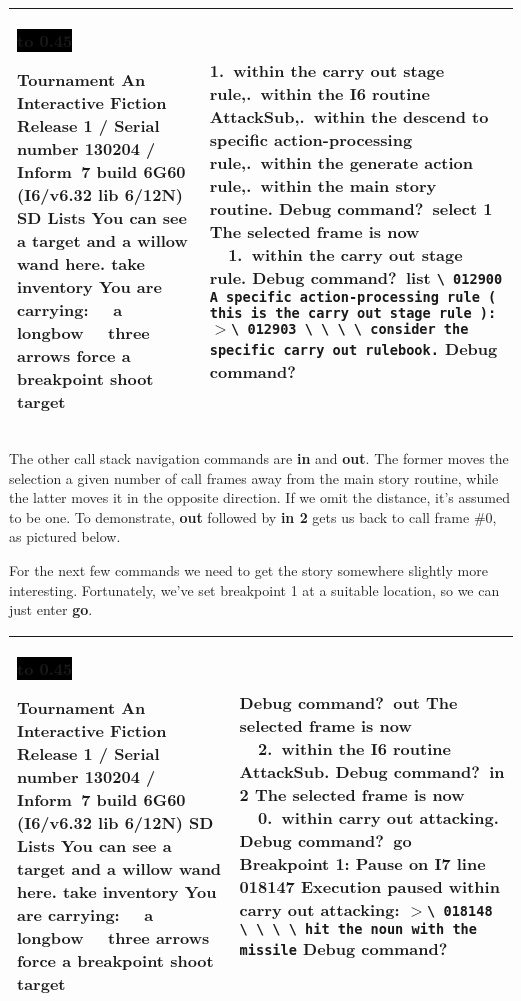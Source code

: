 \documentclass{book}
\newcommand{\n}{\hspace*{\fill}\newline}
\newcommand{\terp}[2]{\begin{center}\begin{tabular}{p{0.45\textwidth}|p{0.45\textwidth}}\midrule #1&#2\\\midrule\end{tabular}\end{center}}
\newcommand{\glkheading}[1]{\textbf{#1}}
\newcommand{\glkinput}[1]{\textbf{#1}}
\newcommand{\glkstatusline}[2]{\centerline{\colorbox{black}{\hbox to 0.45\textwidth{\textcolor{white}{#1\hfil #2}}}}}
\newcommand{\storyprompt}{\raisebox{1.5pt}{\(>\)}}
\newcommand{\cursor}{\raisebox{-1.5pt}{\RectangleThin}}
\newcommand{\markedindent}{\(>\)}
\newcommand{\unmarkedindent}{\hphantom{\(>\)}}
\begin{document}
\terp{\glkstatusline{Lists}{0/2}\n
  \glkheading{Tournament}\n
  An Interactive Fiction\n
  Release 1 / Serial number 130204 / Inform~7 build 6G60 (I6/v6.32 lib 6/12N) SD\n
  \n
  \glkheading{Lists}\n
  You can see a target and a willow wand here.\n
  \n
  \storyprompt\glkinput{take inventory}\n
  You are carrying:\n
  \null\ \ a longbow\n
  \null\ \ three arrows\n
  \n
  \storyprompt\glkinput{force a breakpoint}\n
  \storyprompt\glkinput{shoot target}}{%
  1.\ within the carry out stage rule,\n
  2.\ within the I6 routine AttackSub,\n
  3.\hbox{\ }within the descend to specific action-processing rule,\n
  4.\ within the generate action rule,\n
  5.\ within the main story routine.\n
  Debug command?\ \glkinput{select 1}\n
  \n
  The selected frame is now\n
  \null\ \ 1.\ within the carry out stage rule.\n
  \n
  Debug command?\ \glkinput{list}\n
  \n
  \unmarkedindent \lstinline{\ 012900 A specific action-processing rule ( this is the carry out stage rule ):}\n
  \markedindent \lstinline{\ 012903 \ \ \ \ consider the specific carry out rulebook.}\n
  \n
  Debug command?\ \cursor}

The other call stack navigation commands are \glkinput{in} and \glkinput{out}.
The former moves the selection a given number of call frames away from the main
story routine, while the latter moves it in the opposite direction.  If we omit
the distance, it's assumed to be one.  To demonstrate, \glkinput{out} followed
by \glkinput{in 2} gets us back to call frame \#0, as pictured below.

For the next few commands we need to get the story somewhere slightly more
interesting.  Fortunately, we've set breakpoint 1 at a suitable location, so we
can just enter \glkinput{go}.

\terp{\glkstatusline{Lists}{0/2}\n
  \glkheading{Tournament}\n
  An Interactive Fiction\n
  Release 1 / Serial number 130204 / Inform~7 build 6G60 (I6/v6.32 lib 6/12N) SD\n
  \n
  \glkheading{Lists}\n
  You can see a target and a willow wand here.\n
  \n
  \storyprompt\glkinput{take inventory}\n
  You are carrying:\n
  \null\ \ a longbow\n
  \null\ \ three arrows\n
  \n
  \storyprompt\glkinput{force a breakpoint}\n
  \storyprompt\glkinput{shoot target}}{%
  Debug command?\ \glkinput{out}\n
  \n
  The selected frame is now\n
  \null\ \ 2.\ within the I6 routine AttackSub.\n
  \n
  Debug command?\ \glkinput{in 2}\n
  \n
  The selected frame is now\n
  \null\ \ 0.\ within carry out attacking.\n
  \n
  Debug command?\ \glkinput{go}\n
  \n
  \glkheading{Breakpoint 1:} Pause on I7 line 018147\n
  \n
  Execution paused within carry out attacking:\n
  \markedindent \lstinline{\ 018148 \ \ \ \ hit the noun with the missile}\n
  \n
  Debug command?\ \cursor}
\end{document}
